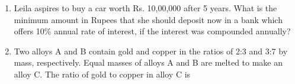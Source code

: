 \documentclass[a4paper, 11pt]{article}
\begin{document}
\begin{enumerate}
    \hfill{}

    \item Leila aspires to buy a car worth Rs. 10,00,000 after 5 years. What is the minimum amount in Rupees that she should deposit now in a bank which offers 10\% annual rate of interest, if the interest was compounded annually?
    \begin{enumerate}
    \end{enumerate}

    \hfill{}

    \item Two alloys A and B contain gold and copper in the ratios of 2:3 and 3:7 by mass, respectively. Equal masses of alloys A and B are melted to make an alloy C. The ratio of gold to copper in alloy C is
    \begin{enumerate}
    \end{enumerate}

    \hfill{}


\end{enumerate}
\end{document}
